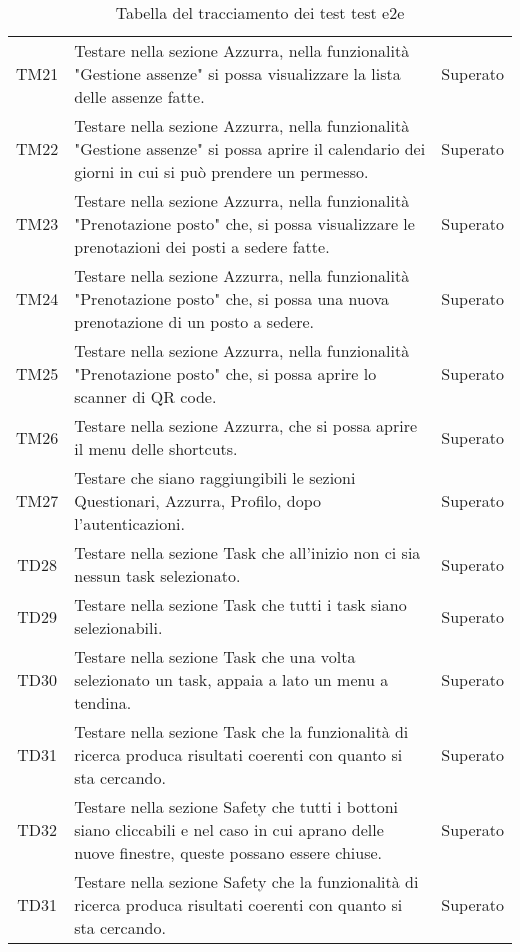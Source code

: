\begin{table}[h]%
	\centering
	\begin{tabularx}{\textwidth}{c X c}
		\hline	
		\rowcolor{giallo}
		\intest{Codice} &  \intest{Descrizione} & \intest{Esito}\\	
		\hline	
		TM21 & Testare nella sezione Azzurra, nella funzionalità "Gestione assenze" si possa visualizzare la lista delle assenze fatte. & Superato\\
		TM22 & Testare nella sezione Azzurra, nella funzionalità "Gestione assenze" si possa aprire il calendario dei giorni in cui si può prendere un permesso. & Superato\\
		TM23 & Testare nella sezione Azzurra, nella funzionalità "Prenotazione posto" che, si possa visualizzare le prenotazioni dei posti a sedere fatte. & Superato\\
		TM24 & Testare nella sezione Azzurra, nella funzionalità "Prenotazione posto" che, si possa una nuova prenotazione di un posto a sedere. & Superato\\
		TM25 & Testare nella sezione Azzurra, nella funzionalità "Prenotazione posto" che, si possa aprire lo scanner di \gls{QR code}\ap{[g]}. & Superato\\
		TM26 & Testare nella sezione Azzurra, che si possa aprire il menu delle shortcuts. & Superato\\
		TM27 & Testare che siano raggiungibili le sezioni Questionari, Azzurra, Profilo, dopo l'autenticazioni. & Superato \\
		TD28 & Testare nella sezione Task che all'inizio non ci sia nessun task selezionato. & Superato \\
		TD29 & Testare nella sezione Task che tutti i task siano selezionabili. & Superato \\
		TD30 & Testare nella sezione Task che una volta selezionato un task, appaia a lato un menu a tendina. & Superato \\
		TD31 & Testare nella sezione Task che la funzionalità di ricerca produca risultati coerenti con quanto si sta cercando. & Superato \\
		TD32 & Testare nella sezione Safety che tutti i bottoni siano cliccabili e nel caso in cui aprano delle nuove finestre, queste possano essere chiuse. & Superato \\
		TD31 & Testare nella sezione Safety che la funzionalità di ricerca produca risultati coerenti con quanto si sta cercando. & Superato \\
	\end{tabularx} \hbox{}
	\caption{Tabella del tracciamento dei test \gls{test e2e}}
\end{table}%
